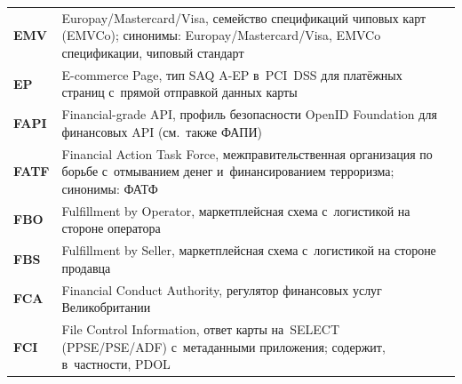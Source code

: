 \begin{longtable}{@{}p{4.5em}p{\dimexpr\linewidth-4.5em-2\tabcolsep\relax}@{}}
  \textbf{EMV}               & Europay/Mastercard/Visa, семейство спецификаций чиповых карт (EMVCo); синонимы: Europay\slash Mastercard\slash Visa, EMVCo спецификации, чиповый стандарт                                                                                                                                         \\
  \textbf{EP}                & E-commerce Page, тип SAQ A-EP в~PCI~DSS для платёжных страниц с~прямой отправкой данных карты                                                                                                                                                                                                       \\
  \textbf{FAPI}              & Financial-grade API, профиль безопасности OpenID Foundation для финансовых API (см.~также ФАПИ)                                                                                                                                                                                                  \\
  \textbf{FATF}              & Financial Action Task Force, межправительственная организация по борьбе с~отмыванием денег и~финансированием терроризма; синонимы: ФАТФ                                                                                                                                                          \\
  \textbf{FBO}               & Fulfillment by Operator, маркетплейсная схема с~логистикой на стороне оператора                                                                                                                                                                                                                  \\
  \textbf{FBS}               & Fulfillment by Seller, маркетплейсная схема с~логистикой на стороне продавца                                                                                                                                                                                                                     \\
  \textbf{FCA}               & Financial Conduct Authority, регулятор финансовых услуг Великобритании                                                                                                                                                                                                                           \\
  \textbf{FCI}               & File Control Information, ответ карты на~SELECT (PPSE/PSE/ADF) с~метаданными приложения; содержит, в~частности, PDOL                                                                                                                                                                            \\

\end{longtable}
